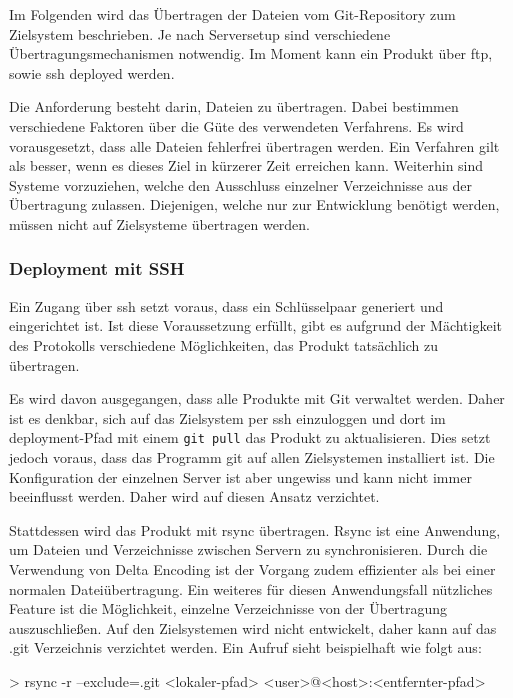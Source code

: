 Im Folgenden wird das Übertragen der Dateien vom Git-Repository zum Zielsystem beschrieben. Je nach Serversetup sind verschiedene Übertragungsmechanismen notwendig. Im Moment kann ein Produkt über \gls{ftp}, sowie \gls{ssh} deployed werden.

Die Anforderung besteht darin, Dateien zu übertragen. Dabei bestimmen verschiedene Faktoren über die Güte des verwendeten Verfahrens. Es wird vorausgesetzt, dass alle Dateien fehlerfrei übertragen werden. Ein Verfahren gilt als besser, wenn es dieses Ziel in kürzerer Zeit erreichen kann. Weiterhin sind Systeme vorzuziehen, welche den Ausschluss einzelner Verzeichnisse aus der Übertragung zulassen. Diejenigen, welche nur zur Entwicklung benötigt werden, müssen nicht auf Zielsysteme übertragen werden.

\subsubsection{Deployment mit SSH} %
\label{ssub:deployment_mit_ssh}

Ein Zugang über \gls{ssh} setzt voraus, dass ein Schlüsselpaar generiert und eingerichtet ist. Ist diese Voraussetzung erfüllt, gibt es aufgrund der Mächtigkeit des Protokolls verschiedene Möglichkeiten, das Produkt tatsächlich zu übertragen.

Es wird davon ausgegangen, dass alle Produkte mit Git verwaltet werden. Daher ist es denkbar, sich auf das Zielsystem per \gls{ssh} einzuloggen und dort im \Gls{deployment}-Pfad mit einem \lstinline!git pull! das Produkt zu aktualisieren. Dies setzt jedoch voraus, dass das Programm git auf allen Zielsystemen installiert ist. Die Konfiguration der einzelnen Server ist aber ungewiss und kann nicht immer beeinflusst werden. Daher wird auf diesen Ansatz verzichtet.

Stattdessen wird das Produkt mit rsync übertragen. Rsync ist eine Anwendung, um Dateien und Verzeichnisse zwischen Servern zu synchronisieren. Durch die Verwendung von Delta Encoding ist der Vorgang zudem effizienter als bei einer normalen Dateiübertragung. Ein weiteres für diesen Anwendungsfall nützliches Feature ist die Möglichkeit, einzelne Verzeichnisse von der Übertragung auszuschließen. Auf den Zielsystemen wird nicht entwickelt, daher kann auf das .git Verzeichnis verzichtet werden. Ein Aufruf sieht beispielhaft wie folgt aus:

> rsync -r --exclude=.git <lokaler-pfad> <user>@<host>:<entfernter-pfad>

